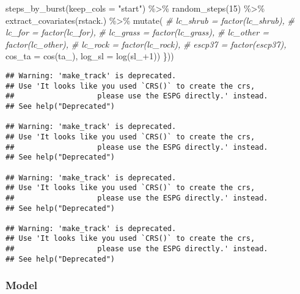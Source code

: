 \documentclass[
]{article}
\newenvironment{Shaded}{\begin{snugshade}}{\end{snugshade}}
\newcommand{\AttributeTok}[1]{\textcolor[rgb]{0.77,0.63,0.00}{#1}}
\newcommand{\CommentTok}[1]{\textcolor[rgb]{0.56,0.35,0.01}{\textit{#1}}}
\newcommand{\DecValTok}[1]{\textcolor[rgb]{0.00,0.00,0.81}{#1}}
\newcommand{\FunctionTok}[1]{\textcolor[rgb]{0.00,0.00,0.00}{#1}}
\newcommand{\NormalTok}[1]{#1}
\newcommand{\SpecialCharTok}[1]{\textcolor[rgb]{0.00,0.00,0.00}{#1}}
\newcommand{\StringTok}[1]{\textcolor[rgb]{0.31,0.60,0.02}{#1}}
\begin{document}
\begin{Shaded}
\begin{Highlighting}[]
      \FunctionTok{steps\_by\_burst}\NormalTok{(}\AttributeTok{keep\_cols =} \StringTok{"start"}\NormalTok{) }\SpecialCharTok{\%\textgreater{}\%}
      \FunctionTok{random\_steps}\NormalTok{(}\DecValTok{15}\NormalTok{) }\SpecialCharTok{\%\textgreater{}\%}
      \FunctionTok{extract\_covariates}\NormalTok{(rstack.) }\SpecialCharTok{\%\textgreater{}\%} 
      \FunctionTok{mutate}\NormalTok{(}
        \CommentTok{\# lc\_shrub = factor(lc\_shrub),}
        \CommentTok{\# lc\_for = factor(lc\_for),}
        \CommentTok{\# lc\_grass = factor(lc\_grass),}
        \CommentTok{\# lc\_other = factor(lc\_other),}
        \CommentTok{\# lc\_rock = factor(lc\_rock),}
        \CommentTok{\# escp37 = factor(escp37),}
        \AttributeTok{cos\_ta =} \FunctionTok{cos}\NormalTok{(ta\_),}
        \AttributeTok{log\_sl =} \FunctionTok{log}\NormalTok{(sl\_}\SpecialCharTok{+}\DecValTok{1}\NormalTok{))}
\NormalTok{  \}))}
\end{Highlighting}
\end{Shaded}

\begin{verbatim}
## Warning: 'make_track' is deprecated.
## Use 'It looks like you used `CRS()` to create the crs,
##                   please use the ESPG directly.' instead.
## See help("Deprecated")

## Warning: 'make_track' is deprecated.
## Use 'It looks like you used `CRS()` to create the crs,
##                   please use the ESPG directly.' instead.
## See help("Deprecated")

## Warning: 'make_track' is deprecated.
## Use 'It looks like you used `CRS()` to create the crs,
##                   please use the ESPG directly.' instead.
## See help("Deprecated")

## Warning: 'make_track' is deprecated.
## Use 'It looks like you used `CRS()` to create the crs,
##                   please use the ESPG directly.' instead.
## See help("Deprecated")
\end{verbatim}

\hypertarget{model-2}{%
\subsubsection{Model}\label{model-2}}
\end{document}
